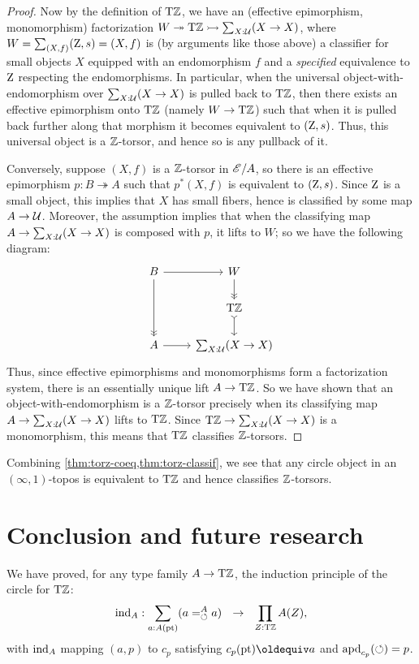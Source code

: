 \documentclass[a4paper,12pt]{amsart}
\begin{document}
\begin{proof}
Now by the definition of ${\mathrm{T}\mathbb{Z}}$, we have an (effective epimorphism, monomorphism) factorization $W \twoheadrightarrow {\mathrm{T}\mathbb{Z}} \rightarrowtail \sum_{X:\mathcal{U}} (X\to X)$, where $W = \sum_{(X,f)} (\mathrm{Z},s)=(X,f)$ is (by arguments like those above) a classifier for small objects $X$ equipped with an endomorphism $f$ and a \emph{specified} equivalence to $\mathrm{Z}$ respecting the endomorphisms.
In particular, when the universal object-with-endomorphism over $\sum_{X:\mathcal{U}} (X\to X)$ is pulled back to ${\mathrm{T}\mathbb{Z}}$, then there exists an effective epimorphism onto ${\mathrm{T}\mathbb{Z}}$ (namely $W\to {\mathrm{T}\mathbb{Z}}$) such that when it is pulled back further along that morphism it becomes equivalent to $(\mathrm{Z},s)$.
Thus, this universal object is a $\mathbb{Z}$-torsor, and hence so is any pullback of it.

Conversely, suppose $(X,f)$ is a $\mathbb{Z}$-torsor in $\mathscr{E}/A$, so there is an effective epimorphism $p:B\twoheadrightarrow A$ such that $p^*(X,f)$ is equivalent to $(\mathrm{Z},s)$.
Since $\mathrm{Z}$ is a small object, this implies that $X$ has small fibers, hence is classified by some map $A\to \mathcal{U}$.
Moreover, the assumption implies that when the classifying map $A\to \sum_{X:\mathcal{U}} (X\to X)$ is composed with $p$, it lifts to $W$; so we have the following diagram:
\[
\begin{tikzcd}
  B \ar[dd,->>] \ar[r] & W \ar[d,->>] \\
  & \TorZ \ar[d,>->] \\
  A \ar[r] & \sum_{X:\UU} (X\to X)
\end{tikzcd}
\]
Thus, since effective epimorphisms and monomorphisms form a factorization system, there is an essentially unique lift $A\to {\mathrm{T}\mathbb{Z}}$.
So we have shown that an object-with-endomorphism is a $\mathbb{Z}$-torsor precisely when its classifying map $A\to \sum_{X:\mathcal{U}} (X\to X)$ lifts to ${\mathrm{T}\mathbb{Z}}$.
Since ${\mathrm{T}\mathbb{Z}} \to \sum_{X:\mathcal{U}} (X\to X)$ is a monomorphism, this means that ${\mathrm{T}\mathbb{Z}}$ classifies $\mathbb{Z}$-torsors.
\end{proof}

Combining \cref{thm:torz-coeq,thm:torz-classif}, we see that any circle object in an $(\infty,1)$-topos is equivalent to ${\mathrm{T}\mathbb{Z}}$ and hence classifies $\mathbb{Z}$-torsors.


\section{Conclusion and future research}\label{sec:conclusion}
We have proved, {for any type family $A\to{\mathrm{T}\mathbb{Z}}$,}
the induction principle of the circle for ${\mathrm{T}\mathbb{Z}}$:
\[
{\mathop{\mathrm{ind}}}_A : \sum_{a:A({\mathord{\mathrm{pt}}})}(a=^A_{\circlearrowleft} a) ~~\to~~ \prod_{Z:{\mathrm{T}\mathbb{Z}}} A(Z),
\]
with ${\mathop{\mathrm{ind}}}_A$ mapping $(a,p)$ to $c_p$ satisfying $c_p(\pt) \jdeq a$
and $\mathop{{\mathrm{apd}}_{c_p}}({\circlearrowleft}) = p$.
\end{document}
